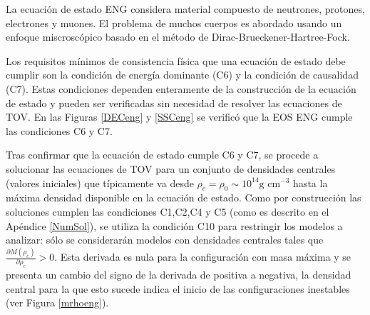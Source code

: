 \noindent La ecuación de estado ENG considera material compuesto de neutrones, protones, electrones y muones. El problema de muchos cuerpos es abordado usando un enfoque miscroscópico basado en el método de Dirac-Brueckener-Hartree-Fock.  

Los requisitos mínimos de consistencia física que una ecuación de estado debe cumplir son la condición de energía dominante (C6) y la condición de causalidad (C7). Estas condiciones dependen enteramente de la construcción de la ecuación de estado y pueden ser verificadas sin necesidad de resolver las ecuaciones de TOV. En las Figuras \ref{DECeng} y \ref{SSCeng} se verificó que la EOS ENG cumple las condiciones C6 y C7.

Tras confirmar que la ecuación de estado cumple C6 y C7, se procede a solucionar las ecuaciones de TOV para un conjunto de densidades centrales (valores iniciales) que típicamente va desde $\rho_c=\rho_0 \sim 10^{14} \text{g cm}^{-3}$ hasta la máxima densidad disponible en la ecuación de estado. Como por construcción las soluciones cumplen las condiciones C1,C2,C4 y C5 (como es descrito en el Apéndice \ref{NumSol}), se utiliza la condición C10 para restringir los modelos a analizar: sólo se considerarán modelos con densidades centrales tales que $\frac { \partial M \left( \rho _ { c } \right) } { \partial \rho _ { c } } > 0$. Esta derivada es nula para la configuración con masa máxima y se presenta un cambio del signo de la derivada de positiva a negativa, la densidad central para la que esto sucede indica el inicio de las configuraciones inestables (ver Figura \ref{mrhoeng}).

